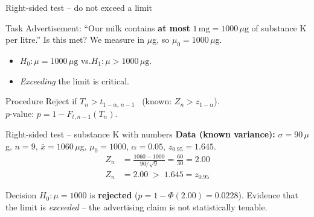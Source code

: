 \documentclass[aspectratio=169,11pt]{beamer}
\begin{document}
\begin{frame}{Right-sided test -- do not exceed a limit}
  \begin{block}{Task}
    Advertisement: ``Our milk contains \textbf{at most}
    $1\,\text{mg} = 1000\,\mu\text{g}$ of substance K per litre.'' Is this
    met? We measure in $\mu$g, so $\mu_0 = 1000\,\mu$g.
  \end{block}
  \begin{itemize}
    \item $H_0:\mu = 1000\,\mu\text{g}$ \quad vs.\quad $H_1:\mu > 1000\,\mu\text{g}$.
    \item \emph{Exceeding} the limit is critical.
  \end{itemize}
  \begin{block}{Procedure}
    Reject if $T_n > t_{1-\alpha,\,n-1}$ \ (known: $Z_n > z_{1-\alpha}$).\\
    $p$-value: $p = 1 - F_{t,n-1}(T_n)$.
  \end{block}
\end{frame}

\begin{frame}{Right-sided test -- substance K with numbers}
  \textbf{Data (known variance):} $\sigma=90\,\mu$g, $n=9$,
  $\bar x = 1060\,\mu$g, $\mu_0=1000$, $\alpha=0.05$, $z_{0.95}=1.645$.
  \begin{align*}
    Z_n &= \frac{1060-1000}{90/\sqrt{9}} = \frac{60}{30} = 2.00\\[2pt]
    Z_n &= 2.00 \;>\; 1.645 = z_{0.95}
  \end{align*}
  \begin{alertblock}{Decision}
    $H_0:\mu=1000$ is \textbf{rejected} ($p = 1-\Phi(2.00) = 0.0228$).
    Evidence that the limit is \emph{exceeded} -- the advertising claim is not
    statistically tenable.
  \end{alertblock}
\end{frame}
\end{document}
